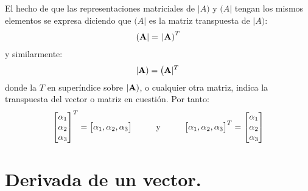 \par
El hecho de que las representaciones matriciales de $| A)$ y $(A |$ tengan los mismos elementos se expresa diciendo que $(A |$ es la matriz transpuesta de $| A)$:
\begin{align}
    ( \vb{A} | = \left. | \vb{A} \right)^{T}
    \label{eq:ecuacion_01_54}
\end{align} 
y similarmente:
\begin{align*}
    | \vb{A} ) = \left( \vb{A} |^{T} \right.
\end{align*}
donde la $T$ en superíndice sobre $| \vb{A} )$, o cualquier otra matriz, indica la transpuesta del vector o matriz en cuestión. Por tanto:
\begin{align}
    \mqty[ \alpha_{1} \\ \alpha_{2} \\ \alpha_{3} ]^{T} = \mqty[ \alpha_{1} , \alpha_{2} , \alpha_{3} ] \hspace{1cm} \text{y} \hspace{1cm} \mqty[ \alpha_{1}, \alpha_{2}, \alpha_{3} ]^{T} = \mqty[ \alpha_{1} \\ \alpha_{2} \\ \alpha_{3} ]
    \label{eq:ecuacion_01_55}
\end{align}

\section{Derivada de un vector.}

